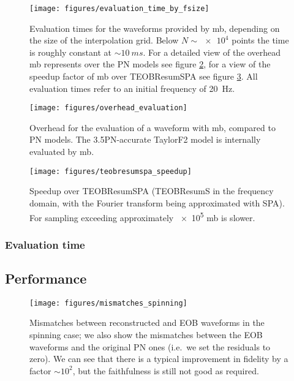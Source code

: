\documentclass[main.tex]{subfiles}
\begin{document}
\begin{figure}[ht]
\centering
\texttt{[image: figures/evaluation\_time\_by\_fsize]}
\caption{Evaluation times for the waveforms provided by \ac{mb}, depending on the size of the interpolation grid. Below \(N \sim \num{e4}\) points the time is roughly constant at \(\sim \SI{10}{ms}\). For a detailed view of the overhead \ac{mb} represents over the \ac{PN} models see figure \ref{fig:overhead_evaluation}, for a view of the speedup factor of \ac{mb} over TEOBResumSPA see figure \ref{fig:teobresumspa_speedup}. All evaluation times refer to an initial frequency of \SI{20}{Hz}.}
\label{fig:evaluation_time_by_fsize}
\end{figure}

\begin{figure}[ht]
\centering
\texttt{[image: figures/overhead\_evaluation]}
\caption{Overhead for the evaluation of a waveform with \ac{mb}, compared to \ac{PN} models. 
The 3.5PN-accurate TaylorF2 model is internally evaluated by \ac{mb}.}
\label{fig:overhead_evaluation}
\end{figure}

\begin{figure}[ht]
\centering
\texttt{[image: figures/teobresumspa\_speedup]}
\caption{Speedup over TEOBResumSPA (TEOBResumS in the frequency domain, with the Fourier transform being approximated with \ac{SPA}). For sampling exceeding approximately \num{e5} \ac{mb} is slower.}
\label{fig:teobresumspa_speedup}
\end{figure}

\subsubsection{Evaluation time} \label{sec:evaluation-time}

\subsection{Performance} \label{sec:performance}

\begin{figure}[ht]
\centering
\texttt{[image: figures/mismatches\_spinning]}
\caption{Mismatches between reconstructed and \ac{EOB} waveforms in the spinning case; we also show the mismatches between the \ac{EOB} waveforms and the original \ac{PN} ones (i.e.\ we set the residuals to zero). We can see that there is a typical improvement in fidelity by a factor \(\sim 10^2\), but the faithfulness is still not good as required.}
\label{fig:mismatches_spinning}
\end{figure}
\end{document}
